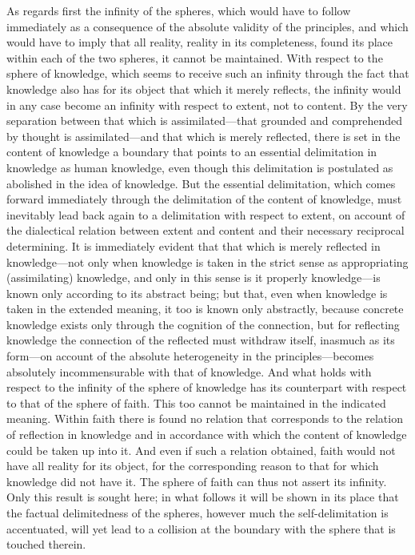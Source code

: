 \documentclass[12pt,a4paper]{book}
\begin{document}
As regards first the infinity of the spheres, which would have to follow
immediately as a consequence of the absolute validity of the principles, and
which would have to imply that all reality, reality in its completeness, found
its place within each of the two spheres, it cannot be maintained. With
respect to the sphere of knowledge, which seems to receive such an infinity
through the fact that knowledge also has for its object that which it merely
reflects, the infinity would in any case become an infinity with respect to
extent, not to content. By the very separation between that which is
assimilated---that grounded and comprehended by thought is assimilated---and
that which is merely reflected, there is set in the content of knowledge a
boundary that points to an essential delimitation in knowledge as human
knowledge, even though this delimitation is postulated as abolished in the idea
of knowledge. But the essential delimitation, which comes forward immediately
through the delimitation of the content of knowledge, must inevitably lead back
again to a delimitation with respect to extent, on account of the dialectical
relation between extent and content and their necessary reciprocal determining.
It is immediately evident that that which is merely reflected in knowledge---not
only when knowledge is taken in the strict sense as appropriating (assimilating)
knowledge, and only in this sense is it properly knowledge---is known only
according to its abstract being; but that, even when knowledge is taken in the
extended meaning, it too is known only abstractly, because concrete knowledge
exists only through the cognition of the connection, but for reflecting
knowledge the connection of the reflected must withdraw itself, inasmuch as its
form---on account of the absolute heterogeneity in the principles---becomes
absolutely incommensurable with that of knowledge. And what holds with respect
to the infinity of the sphere of knowledge has its counterpart with respect to
that of the sphere of faith. This too cannot be maintained in the indicated
meaning. Within faith there is found no relation that corresponds to the
relation of reflection in knowledge and in accordance with which the content of
knowledge could be taken up into it. And even if such a relation obtained,
faith would not have all reality for its object, for the corresponding reason to
that for which knowledge did not have it. The sphere of faith can thus not
assert its infinity. Only this result is sought here; in what follows it will be
shown in its place that the factual delimitedness of the spheres, however much
the self-delimitation is accentuated, will yet lead to a collision at the
boundary with the sphere that is touched therein.
\end{document}
